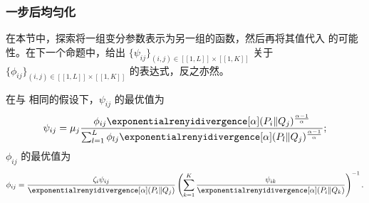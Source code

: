 \subsubsection{一步后均匀化}
在本节中，探索将一组变分参数表示为另一组的函数，然后再将其值代入  的可能性。在下一个命题中，给出 $\{\psi_{ij}\}_{(i,j)\in[\![1,L]\!]\times [\![1,K]\!]}$ 关于 $\{\phi_{ij}\}_{(i,j)\in[\![1,L]\!]\times [\![1,K]\!]}$ 的表达式，反之亦然。

\begin{prop}
    在与  相同的假设下，$\psi_{ij}$ 的最优值为
    \begin{align}
    \label{eq:psi_optim}
        \psi_{ij} = \mu_{j} \frac{\phi_{ij}\exponentialrenyidivergence[\alpha](P_i\Vert Q_j)^{\frac{\alpha-1}{\alpha}}}{\sum_{l=1}^L \phi_{lj}\exponentialrenyidivergence[\alpha](P_l\Vert Q_j)^{\frac{\alpha-1}{\alpha}}};
    \end{align}
    $\phi_{ij}$ 的最优值为
    \begin{align}
    \label{eq:phi_optim}
        \phi_{ij} = \frac{\zeta_i \psi_{ij}}{ \exponentialrenyidivergence[\alpha](P_i\Vert Q_j)} \left(\sum_{k=1}^K\frac{\psi_{ik}}{\exponentialrenyidivergence[\alpha](P_i\Vert Q_k)}\right)^{-1}.
    \end{align}
\end{prop}
